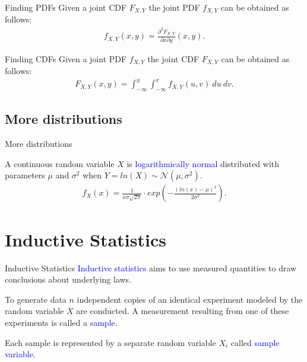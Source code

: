 \documentclass{beamer}
\def\padding{\vspace{0.5cm}}
\def\b{\textcolor{blue}}
\begin{document}
\begin{frame}
    \begin{block}{Finding PDFs}
        Given a joint CDF $F_{X,Y}$ the joint PDF $f_{X,Y}$ can be obtained as follows:
        \begin{align*}
            f_{X,Y}(x,y) = \frac{\partial^2 F_{X,Y}}{\partial x \partial y}(x,y).
        \end{align*}
    \end{block}\pause\par\padding
    \begin{block}{Finding CDFs}
        Given a joint PDF $f_{X,Y}$ the joint CDF $F_{X,Y}$ can be obtained as follows:
        \begin{align*}
            F_{X,Y}(x,y) = \int_{- \infty}^y \int_{- \infty}^x f_{X,Y}(u,v)\ du\ dv.
        \end{align*}
    \end{block}
\end{frame}

\subsection{More distributions}
\begin{frame}{More distributions}
    \begin{definition}
        A continuous random variable $X$ is \b{logarithmically normal} distributed with parameters $\mu$ and $\sigma^2$ when $Y = ln(X) \sim \mathcal{N}(\mu, \sigma^2)$.\pause
        \begin{align*}
            f_X(x) = \frac{1}{x \sigma \sqrt{2 \pi}} \cdot exp\left(-\frac{(ln(x) - \mu)^2}{2 \sigma^2}\right).
        \end{align*}
    \end{definition}
\end{frame}

\section{Inductive Statistics}
\begin{frame}{Inductive Statistics}
    \b{Inductive statistics} aims to use measured quantities to draw conclusions about underlying laws.\pause\par
    To generate data $n$ independent copies of an identical experiment modeled by the random variable $X$ are conducted. A measurement resulting from one of these experiments is called a \b{sample}.\pause\par
    Each sample is represented by a separate random variable $X_i$ called \b{sample variable}.
\end{frame}
\end{document}
